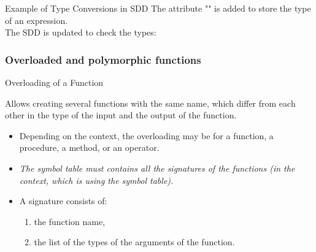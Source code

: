 \begin{bibunit}[apalike]
\begin{frame}{Example of Type Conversions in SDD}
	The attribute "" is added to store the type of an expression. \\
	The SDD is updated to check the types: \\
	\vspace{1em}
	\begin{sdd}
	\end{sdd}
\end{frame}

\subsubsection{Overloaded and polymorphic functions}

\tableofcontentslide[sections={3-6},sectionstyle={show/shaded},subsectionstyle={show/shaded/hide},subsubsectionstyle={show/shaded/hide/hide}]

\begin{frame}{Overloading of a Function}
	\begin{definition}
		Allows creating several functions with the same name, which differ from each other in the type of the input and the output of the function.
	\end{definition}
	\begin{itemize}
	\item Depending on the context, the overloading may be for a function, a procedure, a method, or an operator.
	\item \emph{The symbol table must contains all the signatures of the functions (in the context, which is using the symbol table).}
	\item A signature consists of:
		\begin{enumerate}
		\item the function name,
		\item the list of the types of the arguments of the function.
		\end{enumerate}
	\end{itemize}
\end{frame}


\end{bibunit}
